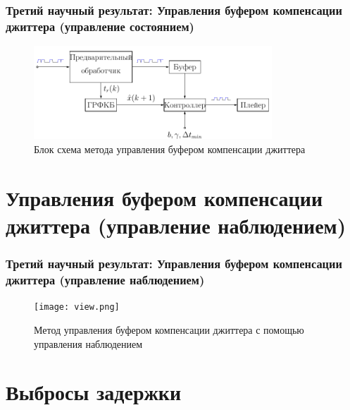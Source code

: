 \documentclass[10pt,pdf,hyperref={unicode}]{beamer}
\begin{document}
\begin{frame}
\frametitle{Третий научный результат: Управления буфером компенсации джиттера (управление состоянием)}

\begin{figure}[!h]
\centering
\includegraphics[width=1\linewidth , height=3.5cm]{manage_buffer.png}
\caption*{Блок схема метода управления буфером компенсации джиттера}
\label{fig:man_5}
\end{figure}

\end{frame}

\section{Управления буфером компенсации джиттера (управление наблюдением)}

\begin{frame}
\frametitle{Третий научный результат: Управления буфером компенсации джиттера (управление наблюдением)}

\begin{figure}[!h]
\centering
\texttt{[image: view.png]}
\caption*{Метод управления буфером компенсации джиттера с помощью управления наблюдением}
\label{fig:man_5}
\end{figure}

\end{frame}

\section{Выбросы задержки}
\end{document}
